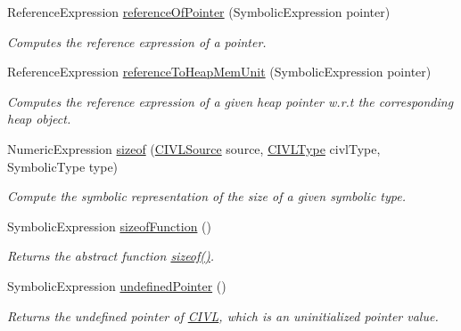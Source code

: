 \begin{DoxyCompactItemize}
Reference\+Expression \hyperlink{classedu_1_1udel_1_1cis_1_1vsl_1_1civl_1_1dynamic_1_1common_1_1CommonSymbolicUtility_a1f61aa2f79eafccfed9b490ba600ac89}{reference\+Of\+Pointer} (Symbolic\+Expression pointer)
\begin{DoxyCompactList}\small\item\em Computes the reference expression of a pointer. \end{DoxyCompactList}\item 
Reference\+Expression \hyperlink{classedu_1_1udel_1_1cis_1_1vsl_1_1civl_1_1dynamic_1_1common_1_1CommonSymbolicUtility_a808e09e1e4ad6c600ab190b41be04b23}{reference\+To\+Heap\+Mem\+Unit} (Symbolic\+Expression pointer)
\begin{DoxyCompactList}\small\item\em Computes the reference expression of a given heap pointer w.\+r.\+t the corresponding heap object. \end{DoxyCompactList}\item 
Numeric\+Expression \hyperlink{classedu_1_1udel_1_1cis_1_1vsl_1_1civl_1_1dynamic_1_1common_1_1CommonSymbolicUtility_ab06c6649800d749fae5313911a122649}{sizeof} (\hyperlink{interfaceedu_1_1udel_1_1cis_1_1vsl_1_1civl_1_1model_1_1IF_1_1CIVLSource}{C\+I\+V\+L\+Source} source, \hyperlink{interfaceedu_1_1udel_1_1cis_1_1vsl_1_1civl_1_1model_1_1IF_1_1type_1_1CIVLType}{C\+I\+V\+L\+Type} civl\+Type, Symbolic\+Type type)
\begin{DoxyCompactList}\small\item\em Compute the symbolic representation of the size of a given symbolic type. \end{DoxyCompactList}\item 
Symbolic\+Expression \hyperlink{classedu_1_1udel_1_1cis_1_1vsl_1_1civl_1_1dynamic_1_1common_1_1CommonSymbolicUtility_aa57f0566a295e1dcb98f53df64a5500a}{sizeof\+Function} ()
\begin{DoxyCompactList}\small\item\em Returns the abstract function {\ttfamily \hyperlink{classedu_1_1udel_1_1cis_1_1vsl_1_1civl_1_1dynamic_1_1common_1_1CommonSymbolicUtility_ab06c6649800d749fae5313911a122649}{sizeof()}}. \end{DoxyCompactList}\item 
Symbolic\+Expression \hyperlink{classedu_1_1udel_1_1cis_1_1vsl_1_1civl_1_1dynamic_1_1common_1_1CommonSymbolicUtility_ab0ce2de739a46abc3ade425833b718ae}{undefined\+Pointer} ()
\begin{DoxyCompactList}\small\item\em Returns the undefined pointer of \hyperlink{classedu_1_1udel_1_1cis_1_1vsl_1_1civl_1_1CIVL}{C\+I\+V\+L}, which is an uninitialized pointer value. \end{DoxyCompactList}\item 

\end{DoxyCompactItemize}
